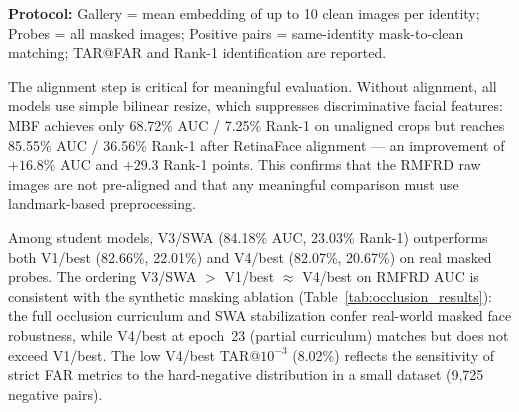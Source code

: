 \textbf{Protocol:} Gallery = mean embedding of up to 10 clean images per identity; Probes = all masked images; Positive pairs = same-identity mask-to-clean matching; TAR@FAR and Rank-1 identification are reported.

\begin{table}[h]
\centering
\caption{Real-world masked face recognition on RMFRD (403 paired identities, RetinaFace-aligned). Gallery: mean of up to 10 clean images per identity. Probe: 1,945 real masked images. Fallback bilinear resize for 7.9\% of masked images where RetinaFace detected no face. Unaligned reference: MBF 68.72\% AUC / 7.25\% Rank-1; V1/best 71.02\% / 4.78\%; V3/SWA 69.90\% / 6.84\%.}
\label{tab:rmfrd}
\end{table}

The alignment step is critical for meaningful evaluation. Without alignment, all models use simple bilinear resize, which suppresses discriminative facial features: MBF achieves only 68.72\% AUC / 7.25\% Rank-1 on unaligned crops but reaches 85.55\% AUC / 36.56\% Rank-1 after RetinaFace alignment — an improvement of $+16.8\%$ AUC and $+29.3$ Rank-1 points. This confirms that the RMFRD raw images are not pre-aligned and that any meaningful comparison must use landmark-based preprocessing.

Among student models, V3/SWA (84.18\% AUC, 23.03\% Rank-1) outperforms both V1/best (82.66\%, 22.01\%) and V4/best (82.07\%, 20.67\%) on real masked probes. The ordering V3/SWA $>$ V1/best $\approx$ V4/best on RMFRD AUC is consistent with the synthetic masking ablation (Table~\ref{tab:occlusion_results}): the full occlusion curriculum and SWA stabilization confer real-world masked face robustness, while V4/best at epoch~23 (partial curriculum) matches but does not exceed V1/best. The low V4/best TAR@$10^{-3}$ (8.02\%) reflects the sensitivity of strict FAR metrics to the hard-negative distribution in a small dataset (9,725 negative pairs).

